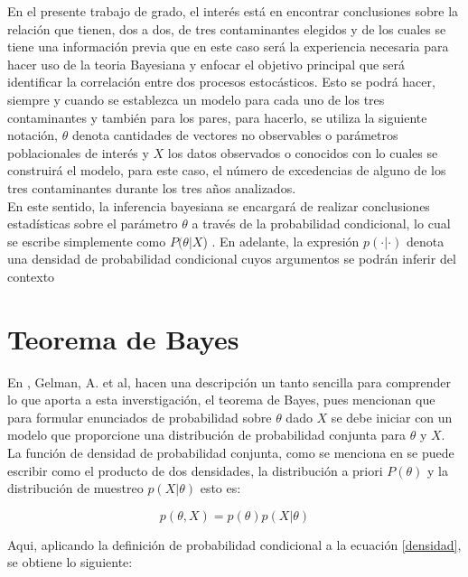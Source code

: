 En el presente trabajo de grado, el interés está en encontrar conclusiones sobre la relación que tienen, dos a dos, de tres contaminantes elegidos y de los cuales se tiene una información previa que en este caso será la experiencia necesaria para hacer uso de la teoria Bayesiana y enfocar el objetivo principal que será identificar la correlación entre dos procesos estocásticos. Esto se podrá hacer, siempre y cuando se establezca un modelo para cada uno de los tres contaminantes y también para los pares, para hacerlo, se utiliza la siguiente notación, $\theta$ denota cantidades de vectores no observables o parámetros poblacionales de interés y  $X$ los datos observados o conocidos con lo cuales se construirá el modelo, para este caso, el número de excedencias de alguno de los tres contaminantes durante los tres años analizados. \\

En este sentido, la inferencia bayesiana se encargará de realizar conclusiones estadísticas sobre el parámetro $\theta$ a través de la probabilidad condicional, lo cual se escribe simplemente como $P(\theta | X$) \cite{infe_bayes}. En adelante, la expresión $p(\cdot|\cdot)$
denota una densidad de probabilidad condicional cuyos argumentos se podrán inferir del contexto  

\section{Teorema de Bayes}

En \cite{infe_bayes}, Gelman, A. et al, hacen una descripción un tanto sencilla para comprender lo que aporta a esta inverstigación, el teorema de Bayes, pues mencionan que para formular enunciados de probabilidad sobre $\theta$ dado $X$ se debe iniciar con un modelo que proporcione una distribución de probabilidad conjunta para $\theta$ y $X$. 
La función de densidad de probabilidad conjunta, como se menciona en \cite{infe_bayes} se puede escribir como el producto de dos densidades, la distribución a priori $P(\theta)$ y la distribución de muestreo $p(X|\theta)$ esto es: 
\begin{center}
\begin{equation}
p(\theta,X)=p(\theta)p(X|\theta)
\label{densidad}
\end{equation}
\end{center}

Aqui, aplicando la definición de probabilidad condicional a la ecuación \ref{densidad}, se obtiene lo siguiente:

